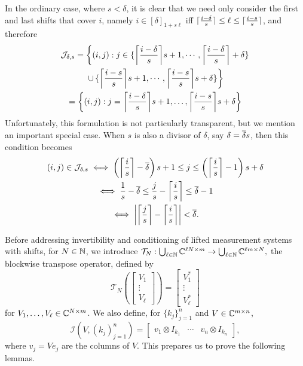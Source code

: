   In the ordinary case, where $s < \delta$, it is clear that we need only consider the first and last shifts that cover $i$, namely $i \in [\delta]_{1 + s \ell}$ iff $\ceil{\frac{i - \delta}{s}} \le \ell \le \ceil{\frac{i - s}{s}}$, and therefore
\begin{gather*}
  \mathcal{J}_{\delta, s} = \left\{(i, j) : j \in \{\ceil*{\frac{i - \delta}{s}}s + 1, \cdots, \ceil*{\frac{i - \delta}{s}} + \delta\}\right. \\
  \left. \cup\, \{\ceil*{\frac{i - s}{s}}s + 1, \cdots, \ceil*{\frac{i - s}{s}}s + \delta\} \right\} \\
  = \left\{(i, j) : j = \ceil*{\frac{i - \delta}{s}}s + 1, \ldots, \ceil*{\frac{i - s}{s}}s + \delta \right\}
\end{gather*}
Unfortunately, this formulation is not particularly transparent, but we mention an important special case.  When $s$ is also a divisor of $\delta$, say $\delta = \deltabar s$, then this condition becomes
\begin{gather*}
  (i, j) \in \mathcal{J}_{\delta, s} \iff \left(\ceil*{\frac{i}{s}} - \deltabar\right) s + 1 \le j \le \left(\ceil*{\frac{i}{s}} - 1\right) s + \delta \\
  \iff \frac{1}{s} - \deltabar \le  \frac{j}{s} - \ceil*{\frac{i}{s}} \le \deltabar - 1 \\
  \iff \left| \ceil*{\frac{j}{s}} - \ceil*{\frac{i}{s}} \right| < \deltabar.
\end{gather*}

Before addressing invertibility and conditioning of lifted measurement systems with shifts, for $N \in \N$, we introduce $\mathcal{T}_N : \bigcup_{\ell \in \N} \C^{\ell N \times m} \to \bigcup_{\ell \in \N} \C^{\ell m \times N},$ the blockwise transpose operator, defined by \[\mathcal{T}_N\left(\begin{bmatrix} V_1 \\ \vdots \\ V_\ell \end{bmatrix}\right) = \begin{bmatrix} V_1^* \\ \vdots \\ V_{\ell}^* \end{bmatrix}\] for $V_1, \ldots, V_\ell \in \C^{N \times m}$.  We also define, for $\{k_j\}_{j = 1}^n$ and $V \in \C^{m \times n}$, \[\mathcal{I}(V, (k_j)_{j = 1}^n) = \begin{bmatrix} v_1 \otimes I_{k_1} & \cdots & v_n \otimes I_{k_n} \end{bmatrix},\]  where $v_j = V e_j$ are the columns of $V$.  This prepares us to prove the following lemmas.

